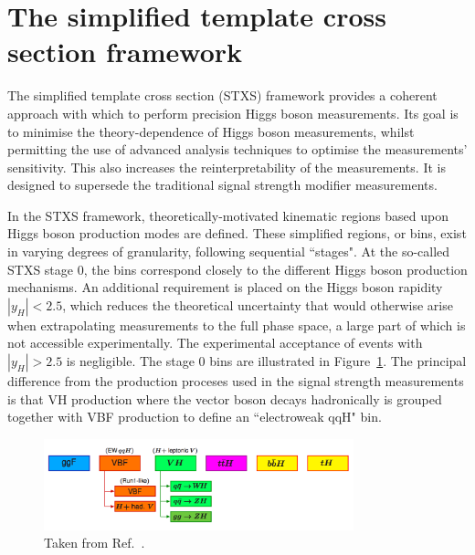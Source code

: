 \section{The simplified template cross section framework}

The simplified template cross section (STXS) framework \cite{YR4}
provides a coherent approach with which to perform precision Higgs boson measurements. 
Its goal is to minimise the theory-dependence of Higgs boson measurements, 
whilst permitting the use of advanced analysis techniques to optimise the measurements' sensitivity.
This also increases the reinterpretability of the measurements.
It is designed to supersede the traditional signal strength modifier measurements.

In the STXS framework, 
theoretically-motivated kinematic regions based upon Higgs boson production modes are defined.
These simplified regions, or bins, exist in varying degrees of granularity, 
following sequential ``stages".
At the so-called STXS stage 0, 
the bins correspond closely to the different Higgs boson production mechanisms.
An additional requirement is placed on the Higgs boson rapidity $|y_H| < 2.5$, 
which reduces the theoretical uncertainty 
that would otherwise arise when extrapolating measurements to the full phase space,
a large part of which is not accessible experimentally.
The experimental acceptance of \Hgg events with $|y_H| > 2.5$ is negligible.
The stage 0 bins are illustrated in Figure~\ref{fig:theory_stage0}.
The principal difference from the production proceses used in the signal strength measurements
is that VH production where the vector boson decays hadronically is grouped together with 
VBF production to define an ``electroweak qqH" bin.

\begin{figure}[hptb]
\centering
\includegraphics[width=0.8\textwidth]{Figures/Theory/stage0.png}
\caption{
  Taken from Ref.~\cite{YR4}.
}
\label{fig:theory_stage0}
\end{figure}

